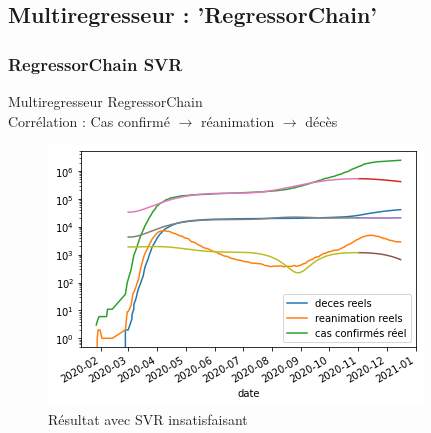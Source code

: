 \documentclass{beamer}
\begin{document}
\subsection{Multiregresseur : 'RegressorChain'}
\begin{frame}%
	\frametitle{RegressorChain SVR}
	Multiregresseur RegressorChain\\ Corrélation : Cas confirmé $\rightarrow$ réanimation $\rightarrow$ décès 
	
	\begin{figure}[h]
		\includegraphics[scale=0.52]{mr_c10000_eps0001 copie}
		\caption{Résultat avec SVR insatisfaisant}
	\end{figure}
\end{frame}
\end{document}

